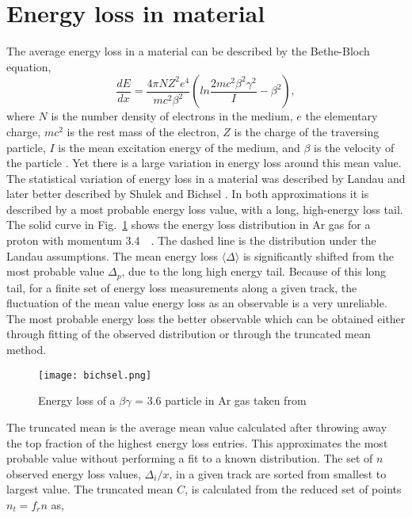 \section{Energy loss in material}
The average energy loss in a material can be described by the Bethe-Bloch equation,
\begin{equation}\label{eq:bb}
\frac{dE}{dx} = \frac{4\pi NZ^2e^4}{mc^2\beta^2} (ln \frac{2mc^2\beta^2\gamma^2}{I} - \beta^2),
\end{equation}
where $N$ is the number density of electrons in the medium, $e$ the elementary charge, $mc^2$ is the rest mass of the electron, $Z$ is the charge of the traversing particle, $I$ is the mean excitation energy of the medium, and $\beta$ is the velocity of the particle \cite{blumrol}. Yet there is a large variation in energy loss around this mean value. The statistical variation of energy loss in a material was described by Landau \cite{landau} and later better described by Shulek \cite{shulek} and Bichsel \cite{bichsel1}. In both approximations it is described by a most probable energy loss value, with a long, high-energy loss tail. The solid curve in Fig.~\ref{fig:straggling} shows the energy loss distribution in Ar gas for a proton with momentum \SI{3.4}{\giga\eVperc}. The dashed line is the distribution under the Landau assumptions. The mean energy loss $\langle\Delta\rangle$ is significantly shifted from the most probable value $\Delta_p$, due to the long high energy tail.  Because of this long tail, for a finite set of energy loss measurements along a given track, the fluctuation of the mean value energy loss as an observable is a very unreliable. The most probable energy loss the better observable which can be obtained either through fitting of the observed distribution or through the truncated mean method. 

\begin{figure}
\texttt{[image: bichsel.png]}
\caption{Energy loss of a $\beta\gamma$ = 3.6 particle in Ar gas taken from \cite{bichsel}}
\label{fig:straggling}
\end{figure}

The truncated mean is the average mean value calculated after throwing away the top fraction of the highest energy loss entries. This approximates the most probable value without performing a fit to a known distribution. The set of $n$ observed energy loss values, $\Delta_i/x$, in a given track are sorted from smallest to largest value. The truncated mean $C$, is calculated from the reduced set of points $n_t = f_r n$ as,

